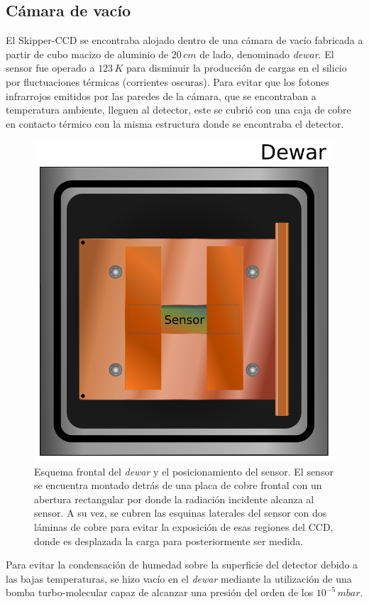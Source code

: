 \subsection{Cámara de vacío}
\noindent El Skipper-CCD se encontraba alojado dentro de una cámara de vacío fabricada a partir de cubo macizo de aluminio de $20\,\si{cm}$ de lado, denominado \textit{dewar}. El sensor fue operado a $123\,\si{K}$ para disminuir la producción de cargas en el silicio por fluctuaciones térmicas (corrientes oscuras). Para evitar que los fotones infrarrojos emitidos por las paredes de la cámara, que se encontraban a temperatura ambiente, lleguen al detector, este se cubrió con una caja de cobre en contacto térmico con la misma estructura donde se encontraba el detector. 
\begin{figure}[h]
    \centering
    \includegraphics[scale=0.5]{Figs/Frontal_Dewar_Sensor.pdf}
    \caption{Esquema frontal del \textit{dewar} y el posicionamiento del sensor. El sensor se encuentra montado detrás de una placa de cobre frontal con un abertura rectangular por donde la radiación incidente alcanza al sensor. A su vez, se cubren las esquinas laterales del sensor con dos láminas de cobre para evitar la exposición de esas regiones del CCD, donde es desplazada la carga para posteriormente ser medida.}
    \label{fig:FrontalDewarYSensor}
\end{figure}
Para evitar la condensación de humedad sobre la superficie del detector debido a las bajas temperaturas, se hizo vacío en el \textit{dewar} mediante la utilización de una bomba turbo-molecular capaz de alcanzar una presión del orden de los $10^{-5}\,\si{mbar}$.

